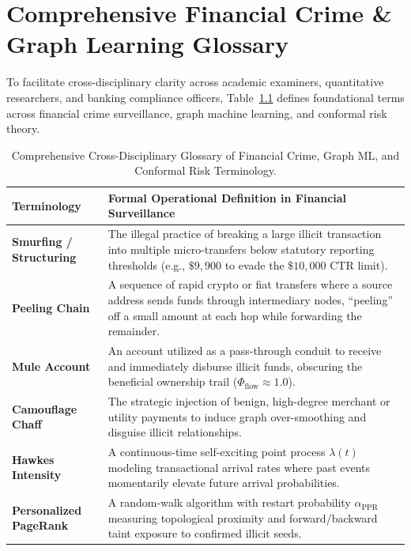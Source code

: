 \appendix
\chapter{Comprehensive Financial Crime \& Graph Learning Glossary}
\label{app:glossary}

To facilitate cross-disciplinary clarity across academic examiners, quantitative researchers, and banking compliance officers, Table~\ref{app_tab:glossary} defines foundational terms across financial crime surveillance, graph machine learning, and conformal risk theory.

\begin{table}[H]
\centering
\caption[Cross-Disciplinary Financial Crime and Graph ML Glossary]{Comprehensive Cross-Disciplinary Glossary of Financial Crime, Graph ML, and Conformal Risk Terminology.}
\label{app_tab:glossary}
\footnotesize\singlespacing
\renewcommand{\arraystretch}{1.0}
\setlength{\tabcolsep}{4pt}
\begin{tabularx}{\textwidth}{@{}>{\raggedright\arraybackslash\bfseries}p{3.55cm} >{\raggedright\arraybackslash}X@{}}
\toprule
\textbf{Terminology} & \textbf{Formal Operational Definition in Financial Surveillance} \\
\midrule
Smurfing / Structuring & The illegal practice of breaking a large illicit transaction into multiple micro-transfers below statutory reporting thresholds (e.g., $\$9,900$ to evade the $\$10,000$ CTR limit). \\
Peeling Chain & A sequence of rapid crypto or fiat transfers where a source address sends funds through intermediary nodes, ``peeling'' off a small amount at each hop while forwarding the remainder. \\
Mule Account & An account utilized as a pass-through conduit to receive and immediately disburse illicit funds, obscuring the beneficial ownership trail ($\Phi_{\text{flow}} \approx 1.0$). \\
Camouflage Chaff & The strategic injection of benign, high-degree merchant or utility payments to induce graph over-smoothing and disguise illicit relationships. \\
Hawkes Intensity & A continuous-time self-exciting point process $\lambda(t)$ modeling transactional arrival rates where past events momentarily elevate future arrival probabilities. \\
Personalized PageRank & A random-walk algorithm with restart probability $\alpha_{\text{PPR}}$ measuring topological proximity and forward/backward taint exposure to confirmed illicit seeds. \\

\end{tabularx}
\end{table}
